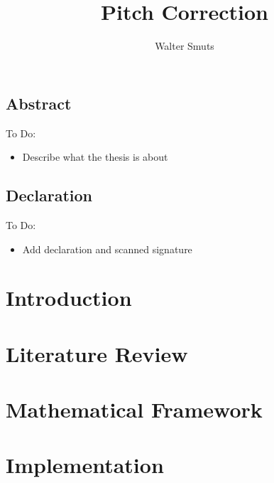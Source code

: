 \documentclass[12pt, twoside, openright]{report}
\title{Pitch Correction}
\author{Walter Smuts}
\begin{document}
\maketitle
\newpage\null\newpage

\setcounter{page}{1}

\section*{Abstract}

{\color{red}
To Do:
\begin{itemize}
	\item Describe what the thesis is about
\end{itemize}
\color{black}
}

\newpage
\section*{Declaration}

{\color{red}
To Do:
\begin{itemize}
	\item Add declaration and scanned signature
\end{itemize}
}

\tableofcontents

\chapter{Introduction}

\setcounter{page}{1}

\Blindtext

\chapter{Literature Review}

\blindtext
\blinddescription
\Blindtext
\Blindtext

\chapter{Mathematical Framework}

\blindmathpaper

\chapter{Implementation}
\end{document}
